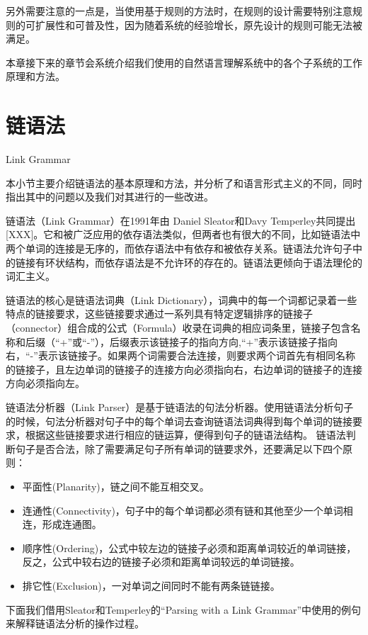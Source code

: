 另外需要注意的一点是，当使用基于规则的方法时，在规则的设计需要特别注意规则的可扩展性和可普及性，因为随着系统的经验增长，原先设计的规则可能无法被满足。

本章接下来的章节会系统介绍我们使用的自然语言理解系统中的各个子系统的工作原理和方法。

\section{链语法}{Link Grammar}\label{sec:linkGrammar}

本小节主要介绍链语法的基本原理和方法，并分析了和语言形式主义的不同，同时指出其中的问题以及我们对其进行的一些改进。

链语法（Link Grammar）在1991年由 Daniel Sleator和Davy Temperley共同提出[XXX]。它和被广泛应用的依存语法类似，但两者也有很大的不同，比如链语法中两个单词的连接是无序的，而依存语法中有依存和被依存关系。链语法允许句子中的链接有环状结构，而依存语法是不允许环的存在的。链语法更倾向于语法理伦的词汇主义。

链语法的核心是链语法词典（Link Dictionary），词典中的每一个词都记录着一些特点的链接要求，这些链接要求通过一系列具有特定逻辑排序的链接子（connector）组合成的公式（Formula）收录在词典的相应词条里，链接子包含名称和后缀（“+”或“-”），后缀表示该链接子的指向方向,“+”表示该链接子指向右，“-”表示该链接子。如果两个词需要合法连接，则要求两个词首先有相同名称的链接子，且左边单词的链接子的连接方向必须指向右，右边单词的链接子的连接方向必须指向左。

链语法分析器（Link Parser）是基于链语法的句法分析器。使用链语法分析句子的时候，句法分析器对句子中的每个单词去查询链语法词典得到每个单词的链接要求，根据这些链接要求进行相应的链运算，便得到句子的链语法结构。 链语法判断句子是否合法，除了需要满足句子所有单词的链要求外，还要满足以下四个原则：

\begin{itemize}
\item 平面性(Planarity)，链之间不能互相交叉。
\item 连通性(Connectivity)，句子中的每个单词都必须有链和其他至少一个单词相连，形成连通图。
\item 顺序性(Ordering)，公式中较左边的链接子必须和距离单词较近的单词链接，反之，公式中较右边的链接子必须和距离单词较远的单词链接。
\item 排它性(Exclusion)，一对单词之间同时不能有两条链链接。
\end{itemize}

下面我们借用Sleator和Temperley的“Parsing with a Link Grammar”\cite{Sleator1993}中使用的例句来解释链语法分析的操作过程。

